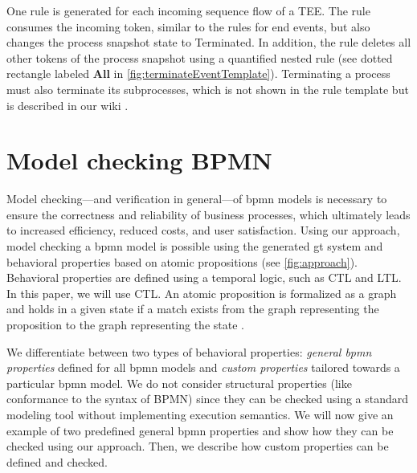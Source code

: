 \documentclass{lmcs} %
\theoremstyle{plain}\newtheorem{satz}[thm]{Satz} %
\begin{document}
One rule is generated for each incoming sequence flow of a TEE.
The rule consumes the incoming token, similar to the rules for end events, but also changes the process snapshot state to \textsf{Terminated}.
In addition, the rule deletes all other tokens of the process snapshot using a quantified nested rule (see dotted rectangle labeled \textbf{All} in \autoref{fig:terminateEventTemplate}).
Terminating a process must also terminate its subprocesses, which is not shown in the rule template but is described in our wiki \cite{krauterArtifactsLMCS2023}.

\section{Model checking BPMN} \label{sec:modelChecking}

Model checking---and verification in general---of \gls*{bpmn} models is necessary to ensure the correctness and reliability of business processes, which ultimately leads to increased efficiency, reduced costs, and user satisfaction.
Using our approach, model checking a \gls*{bpmn} model is possible using the generated \gls*{gt} system and behavioral properties based on atomic propositions (see \autoref{fig:approach}).
Behavioral properties are defined using a temporal logic, such as CTL and LTL.
In this paper, we will use CTL.
An atomic proposition is formalized as a graph and holds in a given state if a match exists from the graph representing the proposition to the graph representing the state \cite{kastenbergModelCheckingDynamic2006}.

We differentiate between two types of behavioral properties: \textit{general \gls*{bpmn} properties} defined for all \gls*{bpmn} models and \textit{custom properties} tailored towards a particular \gls*{bpmn} model.
We do not consider structural properties (like conformance to the syntax of BPMN) since they can be checked using a standard modeling tool without implementing execution semantics.
We will now give an example of two predefined general \gls*{bpmn} properties and show how they can be checked using our approach.
Then, we describe how custom properties can be defined and checked.
\end{document}
